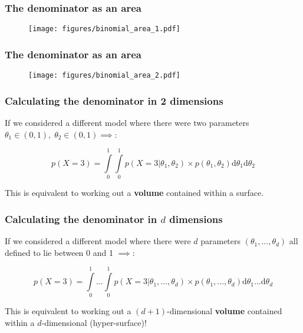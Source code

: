 \documentclass{beamer}
\begin{document}
\begin{frame}
	\frametitle{The denominator as an area}
	
	\begin{figure}
		\centerline{\texttt{[image: figures/binomial\_area\_1.pdf]}}
	\end{figure}
	
\end{frame}

\begin{frame}
	\frametitle{The denominator as an area}
	
	\begin{figure}
		\centerline{\texttt{[image: figures/binomial\_area\_2.pdf]}}
	\end{figure}
	
\end{frame}



\begin{frame}
	\frametitle{Calculating the denominator in 2 dimensions}
	 If we considered a different model where there were two parameters $\theta_1\in(0,1),\; \theta_2\in(0,1)  \implies$:
	
	
	\begin{equation}
	p(X=3) = \int\limits_{0}^{1} \int\limits_{0}^{1} p(X=3|\theta_1,\theta_2)\times p(\theta_1,\theta_2) \mathrm{d}\theta_1 \mathrm{d}\theta_2 
	\end{equation}
	
	 This is equivalent to working out a \textbf{volume} contained within a surface.
	
\end{frame}

\begin{frame}
	\frametitle{Calculating the denominator in $d$ dimensions}
	 If we considered a different model where there were $d$ parameters $(\theta_1,...,\theta_d)$ all defined to lie between 0 and 1 $\implies$:
	
	
	\begin{equation}
	p(X=3) = \int\limits_{0}^{1} ... \int\limits_{0}^{1} p(X=3|\theta_1,...,\theta_d)\times p(\theta_1,...,\theta_d) \mathrm{d}\theta_1...\mathrm{d}\theta_d
	\end{equation}
	
	 This is equivalent to working out a $(d+1)$-dimensional \textbf{volume} contained within a $d$-dimensional (hyper-surface)!
	
	
\end{frame}
\end{document}
